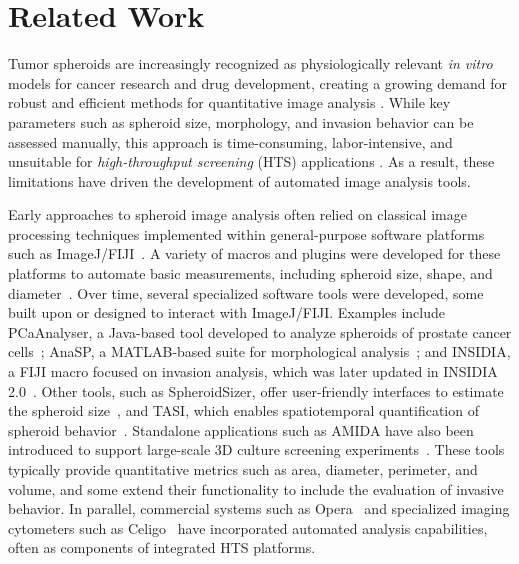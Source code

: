 \documentclass[preprint,12pt]{elsarticle}
\begin{document}
\section{Related Work}
\label{sec:related}

Tumor spheroids are increasingly recognized as physiologically relevant \textit{in vitro} models for cancer research and drug development, creating a growing demand for robust and efficient methods for quantitative image analysis \cite{2012vinci,2013PCaAnalyser,2014AMIDA,2024Dominguez,2025Mali}. While key parameters such as spheroid size, morphology, and invasion behavior can be assessed manually, this approach is time-consuming, labor-intensive, and unsuitable for \textit{high-throughput screening} (HTS) applications \cite{2012vinci,2022Insidia2,2025Mali}. As a result, these limitations have driven the development of automated image analysis tools.

Early approaches to spheroid image analysis often relied on classical image processing techniques implemented within general-purpose software platforms such as ImageJ/FIJI~\cite{2013PCaAnalyser,2014AMIDA,2014SpheroidSizer,2014ivanov,2018tasi,2021spheroidpicker,2022SpheroidAnalyseR}. A variety of macros and plugins were developed for these platforms to automate basic measurements, including spheroid size, shape, and diameter~\cite{2018tasi,2021spheroidpicker,2022SpheroidAnalyseR}. Over time, several specialized software tools were developed, some built upon or designed to interact with ImageJ/FIJI. Examples include PCaAnalyser, a Java-based tool developed to analyze spheroids of prostate cancer cells~\cite{2013PCaAnalyser}; AnaSP, a MATLAB-based suite for morphological analysis~\cite{2015AnaSP}; and INSIDIA, a FIJI macro focused on invasion analysis, which was later updated in INSIDIA 2.0~\cite{2017Insidia,2022Insidia2}. Other tools, such as SpheroidSizer, offer user-friendly interfaces to estimate the spheroid size~\cite{2014SpheroidSizer}, and TASI, which enables spatiotemporal quantification of spheroid behavior~\cite{2018tasi}. Standalone applications such as AMIDA have also been introduced to support large-scale 3D culture screening experiments~\cite{2014AMIDA}. These tools typically provide quantitative metrics such as area, diameter, perimeter, and volume, and some extend their functionality to include the evaluation of invasive behavior. In parallel, commercial systems such as Opera~\cite{2013PCaAnalyser} and specialized imaging cytometers such as Celigo~\cite{2012vinci} have incorporated automated analysis capabilities, often as components of integrated HTS platforms.
\end{document}
